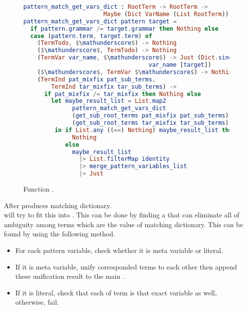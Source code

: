 \documentclass[master.tex]{subfiles}
\begin{document}
\begin{figure}[H]
\begin{framed}
\begin{lstlisting}[language=elm]
pattern_match_get_vars_dict : RootTerm -> RootTerm ->
                       Maybe (Dict VarName (List RootTerm))
pattern_match_get_vars_dict pattern target =
  if pattern.grammar /= target.grammar then Nothing else
  case (pattern.term, target.term) of
    (TermTodo, $\mathunderscore$) -> Nothing
    ($\mathunderscore$, TermTodo) -> Nothing
    (TermVar var_name, $\mathunderscore$) -> Just (Dict.singleton
                                    var_name [target])
    ($\mathunderscore$, TermVar $\mathunderscore$) -> Nothing
    (TermInd pat_mixfix pat_sub_terms,
        TermInd tar_mixfix tar_sub_terms) ->
      if pat_mixfix /= tar_mixfix then Nothing else
        let maybe_result_list = List.map2
              pattern_match_get_vars_dict
              (get_sub_root_terms pat_mixfix pat_sub_terms)
              (get_sub_root_terms tar_mixfix tar_sub_terms)
         in if List.any ((==) Nothing) maybe_result_list then
              Nothing
            else
              maybe_result_list
                |> List.filterMap identity
                |> merge_pattern_variables_list
                |> Just
\end{lstlisting}
\end{framed}
\caption{Function .}
\end{figure}

After  produces matching dictionary. \\
 will try to fit this into
. This can be done by finding a
 that can eliminate all of ambiguity among terms which
are the value of matching dictionary. This  can be found
by using the following method.
\begin{itemize}
\item For each pattern variable, check whether it is meta variable or literal.
\item If it is meta variable, unify corresponded terms to each other then append
  these unification result to the main .
\item If it is literal, check that each of term is that exact variable as well,
  otherwise, fail.
\end{itemize}
\end{document}
